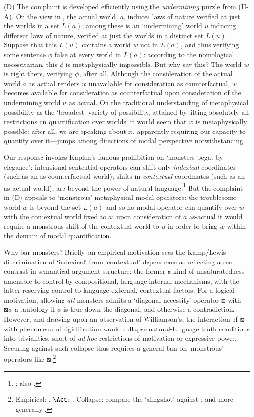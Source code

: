 \documentclass[12pt]{article}
\begin{document}
(D) The complaint is developed efficiently using the \emph{undermining} puzzle
from (II-A). On the view in \citep[sec.~4]{hmw}, the actual world, $a$,
induces laws of nature verified at just the worlds in a set $L(a)$; among
these is an `undermining' world $u$ inducing different laws of nature,
verified at just the worlds in a distinct set $L(u)$. Suppose that this $L(u)$
contains a world $w$ not in $L(a)$, and thus verifying some sentence $\phi$
false at every world in $L(a)$: according to the nomological necessitarian,
this $\phi$ is metaphysically impossible. But why say this? The world $w$ is
right there, verifying $\phi$, after all.  Although the consideration of the
actual world $a$ as actual renders $w$ unavailable for consideration as
counterfactual, $w$ becomes available for consideration as counterfactual upon
consideration of the undermining world $u$ as actual.  On the traditional
understanding of metaphysical possibility as the `broadest' variety of
possibility, attained by lifting absolutely all restrictions on quantification
over worlds, it would seem that $w$ is metaphysically possible: after all, we
are speaking about it, apparently requiring our capacity to quantify over
it---jumps among directions of modal perspective notwithstanding.

Our response invokes Kaplan's famous prohibition on `monsters begat by
elegance': intensional sentential operators can shift only \emph{indexical}
coordinates (such as an as-counterfactual world); shifts in \emph{contextual}
coordinates (such as an as-actual world), are beyond the power of natural
language.\footnote{\citep[sec.~VIII]{kaplan77};  also
\citep{lewis80icc,Israel1996-ISRWMD,Schlenker2002-SCHAPF-4,santorio12,Rabern2013-RABTMQ,stalnaker14}.}
But the complaint in (D) appeals to `monstrous' metaphysical modal operators:
the troublesome world $w$ is beyond the set $L(a)$ and so no modal operator
can quantify over $w$ with the contextual world fixed to $a$; upon
consideration of $a$ as-actual it would require a monstrous shift of the
contextual world to $u$ in order to bring $w$ within the domain of modal
quantification.

Why bar monsters? Briefly, an empirical motivation sees the Kamp/Lewis discrimination
of `indexical' from `contextual' dependence as reflecting a real contrast in
semantical argument structure: the former a kind of unsaturatedness amenable
to control by compositional, language-internal mechanisms, with the latter
reserving control to language-external, contextual factors. 
For a logical
motivation, allowing \emph{all} monsters admits a `diagonal necessity'
operator $\boxbslash$ with $\boxbslash\phi$ a tautology if
$\phi$ is true down the diagonal, and otherwise a contradiction. 
However, and drawing upon an observation of Williamson's, the interaction of 
$\boxbslash$ with phenomena of rigidification 
would collapse natural-language truth conditions into trivialities, short of
\emph{ad hoc} restrictions of motivation or expressive power. Securing against
such collapse thus requires a general ban on `monstrous' operators like
$\boxbslash$.\footnote{Empirical:
\citep[pp.~31--2]{lewis80icc}. $\Act$: \citep{williamson09ca}. Collapse:
compare the \citep{church43c} `slingshot' against \citep{carnapis}; and more
generally \citep{Neale2001-NEAFF}.} 
\end{document}

